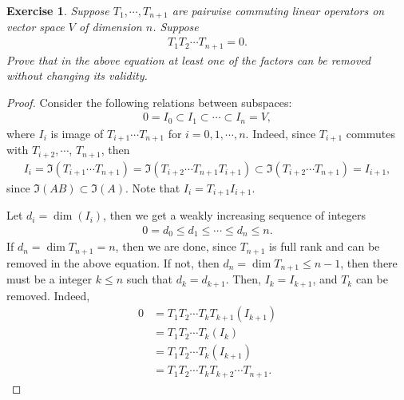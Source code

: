 \documentclass[11pt]{article}
\newtheorem{exercise}{Exercise}[section]
\theoremstyle{definition}
\numberwithin{equation}{subsection}
\begin{document}
\medskip

\begin{exercise}{\rm *}
Suppose $T_1, \cdots, T_{n+1}$ are pairwise commuting linear operators on vector space $V$ of dimension $n$. Suppose 
\begin{align*}
    T_1 T_2 \cdots T_{n+1} = 0.
\end{align*}
Prove that in the above equation at least one of the factors can be removed without changing its validity.
\end{exercise}
\begin{proof}
Consider the following relations between subspaces\cite{7}:
\begin{align*}
    0 = I_0 \subset I_1 \subset \cdots \subset I_n = V,
\end{align*}
where $I_i$ is image of $T_{i+1}\cdots T_{n+1}$ for $i = 0, 1, \cdots, n$. Indeed, since $T_{i+1}$ commutes with $T_{i+2}, \cdots$, $T_{n+1}$, then 
\begin{align*}
    I_i = \Im (T_{i+1}\cdots T_{n+1}) = \Im (T_{i+2}\cdots T_{n+1} T_{i+1}) \subset \Im (T_{i+2}\cdots T_{n+1}) = I_{i+1},
\end{align*}
since $\Im(AB) \subset \Im(A)$. Note that $I_i = T_{i+1}I_{i+1}$.

Let $d_i = \dim (I_i)$, then we get a weakly increasing sequence of integers
\begin{align*}
    0 = d_0 \leq d_1 \leq \cdots \leq d_n \leq n.
\end{align*}
If $d_n = \dim T_{n+1} = n$, then we are done, since $T_{n+1}$ is full rank and can be removed in the above equation. If not, then $d_n = \dim T_{n+1} \leq n - 1$, then there must be a integer $k \leq n$ such that $d_k = d_{k+1}$. Then, $I_{k} = I_{k+1}$, and $T_k$ can be removed. Indeed,
\begin{align*}
    0 & = T_1 T_2 \cdots T_k T_{k+1} (I_{k+1}) \\
    & = T_1 T_2 \cdots T_k (I_k) \\
    & = T_1 T_2 \cdots T_k (I_{k+1}) \\
    & = T_1 T_2 \cdots T_k T_{k+2} \cdots T_{n+1}.
\end{align*}
\end{proof}

\medskip
\end{document}

